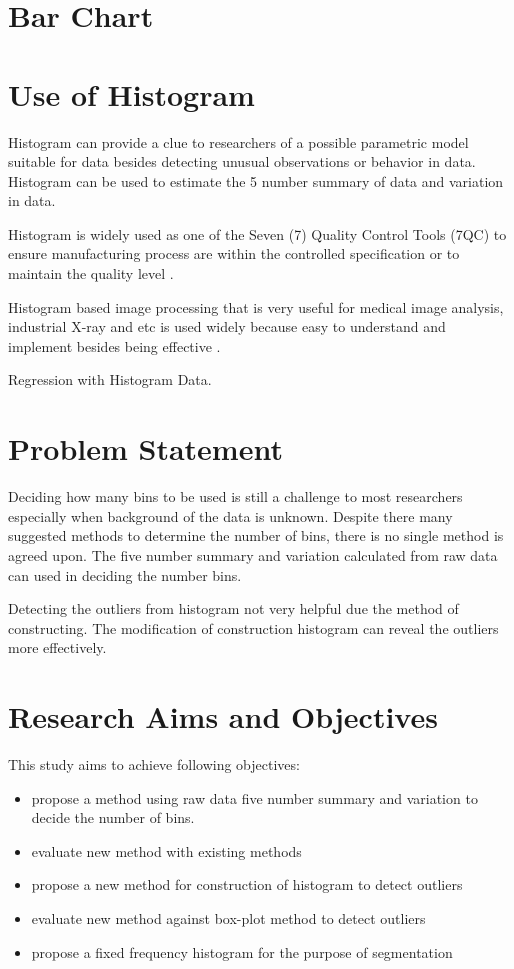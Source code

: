 \section{Bar Chart}

\section{Use of Histogram}

Histogram can provide a clue to researchers of a possible parametric model suitable for data  \cite[]{wendy2002computational} besides detecting unusual observations or behavior in data. Histogram can be used to estimate the 5 number summary of data and variation in data.

Histogram is widely used as one of the Seven (7) Quality Control Tools (7QC) to ensure manufacturing process are within the controlled specification or to maintain the quality level \cite[]{magar2014application}. 


Histogram based image processing that is very useful for medical image analysis, industrial X-ray and etc is used widely because easy to understand and implement besides being effective \cite[]{sharma2015review}.


Regression with Histogram Data.

\section{Problem Statement}

Deciding how many bins to be used is still a challenge to most researchers especially when background of the data is unknown. Despite there many suggested methods to determine the number of bins, there is no single method is agreed upon. The five number summary and variation calculated from raw data can used in deciding the number bins.

Detecting the outliers from histogram not very helpful due the method of constructing. The modification of construction histogram can reveal the outliers more effectively.


\section{Research Aims and Objectives}

This study aims to achieve following objectives:

\begin{itemize}
	\item propose a method using raw data five number summary and variation to decide the number of bins.
	\item evaluate new method with existing methods
	\item propose a new method for construction of histogram to detect outliers
	\item evaluate new method against box-plot method to detect outliers
	\item propose a fixed frequency histogram for the purpose of segmentation 

\end{itemize}



